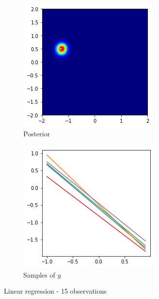 \documentclass{article}
\begin{document}
\begin{figure}[H]
	\centering
	\begin{subfigure}[t]{0.3\linewidth}
		\includegraphics[width=\linewidth]{15-posterior}
		\caption{Posterior}
		\label{fig:15-p}
	\end{subfigure}
	\begin{subfigure}[t]{0.3\linewidth}
		\includegraphics[width=\linewidth]{15-samples}
		\caption{Samples of $y$}
		\label{fig:15-s}
	\end{subfigure}
	\caption{Linear regression - 15 observations}
	\label{fig:15-s}
\end{figure} \\
\end{document}
